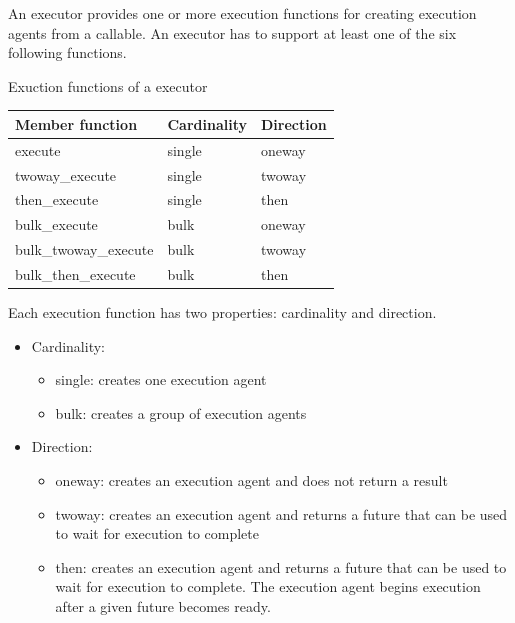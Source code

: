 An executor provides one or more execution functions for creating execution agents from a callable. An executor has to support at least one of the six following functions.

\begin{center}
Exuction functions of a executor
\end{center}

\begin{table}[H]
\centering
\begin{tabular}{lll}
\textbf{Member function} & \textbf{Cardinality} & \textbf{Direction} \\ \hline
execute                  & single               & oneway             \\
twoway\_execute          & single               & twoway             \\
then\_execute            & single               & then               \\
bulk\_execute            & bulk                 & oneway             \\
bulk\_twoway\_execute    & bulk                 & twoway             \\
bulk\_then\_execute      & bulk                 & then              
\end{tabular}
\end{table}

Each execution function has two properties: cardinality and direction.

\begin{itemize}
\item 
Cardinality:
\begin{itemize}
\item 
single: creates one execution agent

\item 
bulk: creates a group of execution agents
\end{itemize}

\item 
Direction:
\begin{itemize}
\item 
oneway: creates an execution agent and does not return a result

\item
twoway: creates an execution agent and returns a future that can be used to wait for execution to complete

\item
then: creates an execution agent and returns a future that can be used to wait for execution to complete. The execution agent begins execution after a given future becomes ready.
\end{itemize}
\end{itemize}

